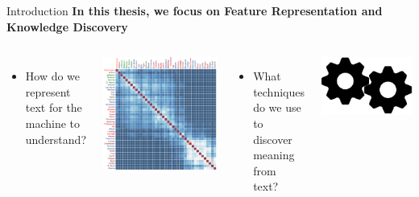 \documentclass[10pt,xcolor=table]{beamer}
\begin{document}
	
\begin{frame}{Introduction}
\large  \textbf{In this thesis, we focus on {Feature Representation} and {Knowledge Discovery}} \hfill


\begin{columns}
\begin{itemize}
\item[] How do we represent text for the machine to understand? 
\end{itemize}
\begin{minipage}[c][0.5\textheight][c]{\linewidth}
\centering
\includegraphics[width=.7\linewidth]{image2/Chapitre1/matrix.png}
\end{minipage}
\begin{itemize}
\item[] What techniques do we use to discover meaning from text?
\end{itemize}
\begin{minipage}[c][0.5\textheight][c]{\linewidth}
\centering
\includegraphics[width=.8\linewidth]{image2/Chapitre1/kdisc.png}
\end{minipage}
\end{columns}

\vspace{\textheight}
\end{frame}
\end{document}

